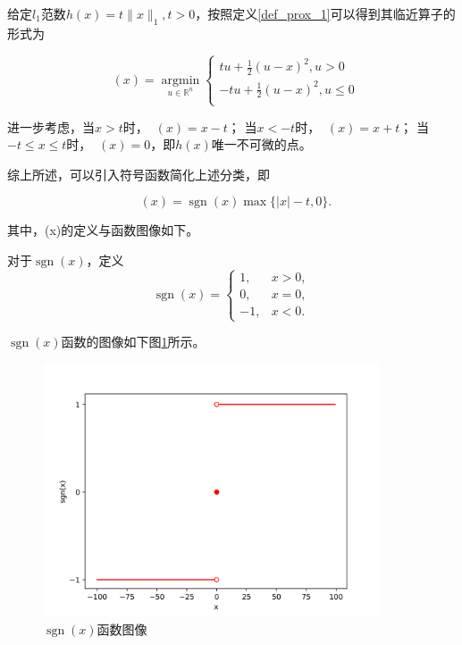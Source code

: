 \begin{solution}
    给定$l_{1}$范数$h(x)=t\|x\|_{1}, t>0$，按照定义\ref{def_prox_1}可以得到其临近算子的形式为

    \begin{equation}
        \mathop{\mathrm{prox_{h}}}(x) = \mathop{\mathrm{argmin}}\limits_{u\in \mathbb{R}^{n}}
        \begin{cases}
            tu + \frac{1}{2}(u-x)^{2}, u>0      \\
            -tu + \frac{1}{2}(u-x)^{2}, u\leq 0 \\
        \end{cases}
    \end{equation}

    进一步考虑，当$x>t$时，$\mathop{\mathrm{prox_{h}}}(x) = x-t$；
    当$x<-t$时，$\mathop{\mathrm{prox_{h}}}(x) = x+t$；
    当$-t\leq x\leq t$时，$\mathop{\mathrm{prox_{h}}}(x) = 0$，即$h(x)$唯一不可微的点。

    综上所述，可以引入符号函数简化上述分类，即
    
    \begin{equation}\label{eq_prox_3}
        \mathop{\mathrm{prox_{h}}}(x) = \mathop{\mathrm{sgn}}(x)\max\{|x|-t, 0\}.
    \end{equation}
    
    其中，(x)的定义与函数图像如下。
    \begin{definition}
        对于$\mathop{\mathrm{sgn}}(x)$，定义
        \begin{equation}
            \mathop{\mathrm{sgn}}(x) = 
            \begin{cases}
                1, &x > 0, \\
                0, &x = 0, \\
                -1, &x < 0.
            \end{cases}
        \end{equation}
    \end{definition}

    $\mathop{\mathrm{sgn}}(x)$函数的图像如下图\ref{figure_sgn}所示。
    \begin{figure}[hbtp]
        \centering
        \includegraphics[width=100mm]{./Figures/sgn_figure.png}
        \caption{$\mathop{\mathrm{sgn}}(x)$函数图像}
        \label{figure_sgn}
    \end{figure}
\end{solution}

